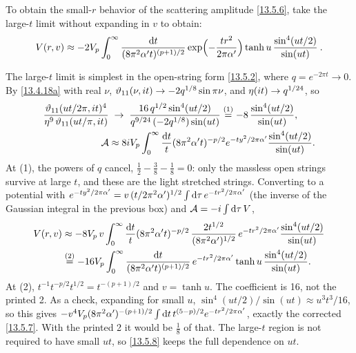 To obtain the small-$r$ behavior of the scattering amplitude \eqref{13.5.6}, take the large-$t$ limit without expanding in $v$ to obtain:
\begin{equation}
	V(r,v) \approx -2V_p\int_0^\infty \frac{\mathrm{d} t}{(8\pi^2\alpha' t)^{(p+1)/2}}\exp\Bigl(-\frac{t r^2}{2\pi\alpha'}\Bigr)\tanh u\,\frac{\sin^4(ut/2)}{\sin(ut)} \:. \label{13.5.8}
\end{equation}
\begin{tcolorbox}[breakable]
	\begin{remark}
		The large-$t$ limit is simplest in the open-string form \eqref{13.5.2}, where $q=e^{-2\pi t}\to0$. By \eqref{13.4.18a} with real $\nu$, $\vartheta_{11}(\nu,i t)\to-2q^{1/8}\sin\pi\nu$, and $\eta(i t)\to q^{1/24}$, so
		\begin{align*}
			\frac{\vartheta_{11}(ut/2\pi,i t)^4}{\eta^9\,\vartheta_{11}(ut/\pi,i t)} &\;\to\; \frac{16\,q^{1/2}\sin^4(ut/2)}{q^{9/24}\,(-2q^{1/8})\sin(ut)} \overset{(1)}{=} -8\,\frac{\sin^4(ut/2)}{\sin(ut)} ,\\
			\mathcal A &\approx 8i V_p\int_0^\infty\frac{\mathrm{d} t}{t}(8\pi^2\alpha't)^{-p/2}e^{-ty^2/2\pi\alpha'}\frac{\sin^4(ut/2)}{\sin(ut)} .
		\end{align*}
		At (1), the powers of $q$ cancel, $\frac12-\frac38-\frac18=0$: only the massless open strings survive at large $t$, and these are the light stretched strings. Converting to a potential with $e^{-ty^2/2\pi\alpha'}=v\,(t/2\pi^2\alpha')^{1/2}\int\mathrm{d}\tau\,e^{-tr^2/2\pi\alpha'}$ (the inverse of the Gaussian integral in the previous box) and $\mathcal A=-i\int\mathrm{d}\tau\,V$,
		\begin{align*}
			V(r,v) &\approx -8V_p\,v\int_0^\infty\frac{\mathrm{d} t}{t}(8\pi^2\alpha't)^{-p/2}\,\frac{2t^{1/2}}{(8\pi^2\alpha')^{1/2}}\,e^{-tr^2/2\pi\alpha'}\frac{\sin^4(ut/2)}{\sin(ut)}\\
			&\overset{(2)}{=} -16V_p\int_0^\infty\frac{\mathrm{d} t}{(8\pi^2\alpha't)^{(p+1)/2}}\,e^{-tr^2/2\pi\alpha'}\tanh u\,\frac{\sin^4(ut/2)}{\sin(ut)} .
		\end{align*}
		At (2), $t^{-1}t^{-p/2}t^{1/2}=t^{-(p+1)/2}$ and $v=\tanh u$. The coefficient is 16, not the printed 2. As a check, expanding for small $u$, $\sin^4(ut/2)/\sin(ut)\approx u^3t^3/16$, so this gives $-v^4V_p(8\pi^2\alpha')^{-(p+1)/2}\int\mathrm{d} t\,t^{(5-p)/2}e^{-tr^2/2\pi\alpha'}$, exactly the corrected \eqref{13.5.7}. With the printed 2 it would be $\frac18$ of that. The large-$t$ region is not required to have small $u t$, so \eqref{13.5.8} keeps the full dependence on $ut$.


\end{remark}
\end{tcolorbox}
